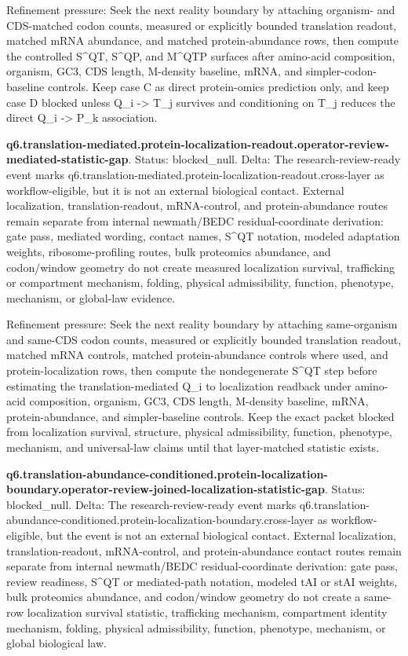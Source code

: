 Refinement pressure: Seek the next reality boundary by attaching organism- and CDS-matched codon counts, measured or explicitly bounded translation readout, matched mRNA abundance, and matched protein-abundance rows, then compute the controlled S\textasciicircum{}QT, S\textasciicircum{}QP, and M\textasciicircum{}QTP surfaces after amino-acid composition, organism, GC3, CDS length, M-density baseline, mRNA, and simpler-codon-baseline controls. Keep case C as direct protein-omics prediction only, and keep case D blocked unless Q\_i -> T\_j survives and conditioning on T\_j reduces the direct Q\_i -> P\_k association.

\textbf{q6.translation-mediated.protein-localization-readout.operator-review-mediated-statistic-gap}. Status: blocked\_null. Delta: The research-review-ready event marks q6.translation-mediated.protein-localization-readout.cross-layer as workflow-eligible, but it is not an external biological contact. External localization, translation-readout, mRNA-control, and protein-abundance routes remain separate from internal newmath/BEDC residual-coordinate derivation: gate pass, mediated wording, contact names, S\textasciicircum{}QT notation, modeled adaptation weights, ribosome-profiling routes, bulk proteomics abundance, and codon/window geometry do not create measured localization survival, trafficking or compartment mechanism, folding, physical admissibility, function, phenotype, mechanism, or global-law evidence.

Refinement pressure: Seek the next reality boundary by attaching same-organism and same-CDS codon counts, measured or explicitly bounded translation readout, matched mRNA controls, matched protein-abundance controls where used, and protein-localization rows, then compute the nondegenerate S\textasciicircum{}QT step before estimating the translation-mediated Q\_i to localization readback under amino-acid composition, organism, GC3, CDS length, M-density baseline, mRNA, protein-abundance, and simpler-baseline controls. Keep the exact packet blocked from localization survival, structure, physical admissibility, function, phenotype, mechanism, and universal-law claims until that layer-matched statistic exists.

\textbf{q6.translation-abundance-conditioned.protein-localization-boundary.operator-review-joined-localization-statistic-gap}. Status: blocked\_null. Delta: The research-review-ready event marks q6.translation-abundance-conditioned.protein-localization-boundary.cross-layer as workflow-eligible, but the event is not an external biological contact. External localization, translation-readout, mRNA-control, and protein-abundance contact routes remain separate from internal newmath/BEDC residual-coordinate derivation: gate pass, review readiness, S\textasciicircum{}QT or mediated-path notation, modeled tAI or stAI weights, bulk proteomics abundance, and codon/window geometry do not create a same-row localization survival statistic, trafficking mechanism, compartment identity mechanism, folding, physical admissibility, function, phenotype, mechanism, or global biological law.


